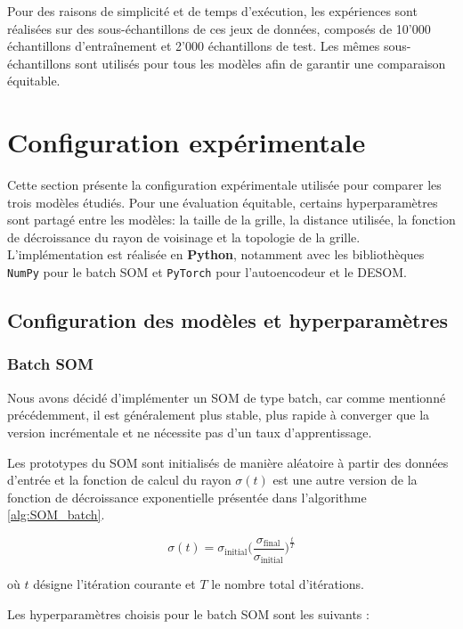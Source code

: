 \documentclass[12pt,a4paper]{report}
\begin{document}
Pour des raisons de simplicité et de temps d'exécution, les expériences sont réalisées sur des sous-échantillons de ces jeux de données, 
composés de 10'000 échantillons d'entraînement et 2'000 échantillons de test. Les mêmes sous-échantillons sont utilisés pour tous les modèles afin de garantir une comparaison équitable.


\section{Configuration expérimentale}
Cette section présente la configuration expérimentale utilisée pour comparer les trois modèles étudiés. Pour une évaluation équitable, 
certains hyperparamètres sont partagé entre les modèles: la taille de la grille, la distance utilisée, la fonction de décroissance du rayon de voisinage
et la topologie de la grille. L'implémentation est réalisée en \textbf{Python}, notamment avec les bibliothèques \texttt{NumPy} pour le batch SOM et \texttt{PyTorch} pour l'autoencodeur et le DESOM.

\subsection{Configuration des modèles et hyperparamètres}
\subsubsection{Batch SOM}
Nous avons décidé d'implémenter un SOM de type batch, car comme mentionné précédemment, il est généralement plus stable, plus rapide à converger que la version incrémentale
et ne nécessite pas d'un taux d'apprentissage.

Les prototypes du SOM sont initialisés de manière aléatoire à partir des données d'entrée et la fonction de calcul du rayon $\sigma(t)$
est une autre version de la fonction de décroissance exponentielle présentée dans l'algorithme \ref{alg:SOM_batch}.

$$ \sigma(t) = \sigma_{\text{initial}} \bigg(\frac{\sigma_{\text{final}}}{\sigma_{\text{initial}}}\bigg)^{\frac{t}{T}} $$

où $t$ désigne l'itération courante et $T$ le nombre total d'itérations.

Les hyperparamètres choisis pour le batch SOM sont les suivants :
\end{document}
